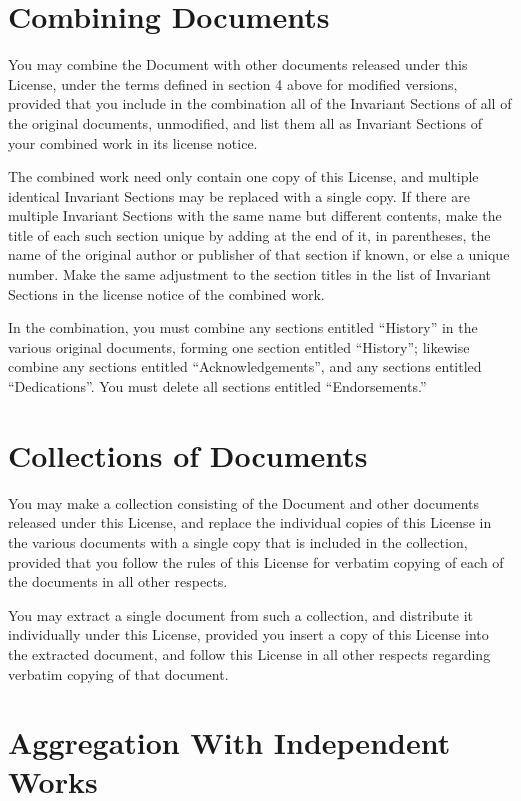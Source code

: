 	\section{Combining Documents}

	You may combine the Document with other documents released under this
	License, under the terms defined in section 4 above for modified
	versions, provided that you include in the combination all of the
	Invariant Sections of all of the original documents, unmodified, and
	list them all as Invariant Sections of your combined work in its
	license notice.

	The combined work need only contain one copy of this License, and
	multiple identical Invariant Sections may be replaced with a single
	copy.  If there are multiple Invariant Sections with the same name but
	different contents, make the title of each such section unique by
	adding at the end of it, in parentheses, the name of the original
	author or publisher of that section if known, or else a unique number.
	Make the same adjustment to the section titles in the list of
	Invariant Sections in the license notice of the combined work.

	In the combination, you must combine any sections entitled ``History''
	in the various original documents, forming one section entitled
	``History''; likewise combine any sections entitled ``Acknowledgements'',
	and any sections entitled ``Dedications''.  You must delete all sections
	entitled ``Endorsements.''


	\section{Collections of Documents}

	You may make a collection consisting of the Document and other documents
	released under this License, and replace the individual copies of this
	License in the various documents with a single copy that is included in
	the collection, provided that you follow the rules of this License for
	verbatim copying of each of the documents in all other respects.

	You may extract a single document from such a collection, and distribute
	it individually under this License, provided you insert a copy of this
	License into the extracted document, and follow this License in all
	other respects regarding verbatim copying of that document.



	\section{Aggregation With Independent Works}

